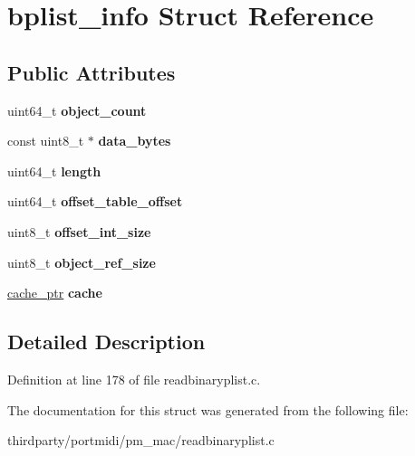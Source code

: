 \hypertarget{structbplist__info}{}\section{bplist\+\_\+info Struct Reference}
\label{structbplist__info}
\subsection*{Public Attributes}
\begin{DoxyCompactItemize}
\item 
\mbox{\label{structbplist__info_a2664eb47360dff6639f4085a50f321c9}} 
uint64\+\_\+t {\bfseries object\+\_\+count}
\item 
\mbox{\label{structbplist__info_ab0c039cf2d64b066815b31f648f3e165}} 
const uint8\+\_\+t $\ast$ {\bfseries data\+\_\+bytes}
\item 
\mbox{\label{structbplist__info_ae15894e235d748166b0c928e0a36670f}} 
uint64\+\_\+t {\bfseries length}
\item 
\mbox{\label{structbplist__info_ab999b6c7a605a4b0f9ba31d8ff10dc7f}} 
uint64\+\_\+t {\bfseries offset\+\_\+table\+\_\+offset}
\item 
\mbox{\label{structbplist__info_ab8fd5fa265f809e0ed0f245a1ae71ad6}} 
uint8\+\_\+t {\bfseries offset\+\_\+int\+\_\+size}
\item 
\mbox{\label{structbplist__info_ab8d0fc75c50cbbb4ae8ac400482d14bd}} 
uint8\+\_\+t {\bfseries object\+\_\+ref\+\_\+size}
\item 
\mbox{\label{structbplist__info_a3ea7b1feecc7c5fa1f988e39f57c7c4a}} 
\hyperlink{structcache__struct}{cache\+\_\+ptr} {\bfseries cache}
\end{DoxyCompactItemize}


\subsection{Detailed Description}


Definition at line 178 of file readbinaryplist.\+c.



The documentation for this struct was generated from the following file\+:\begin{DoxyCompactItemize}
\item 
thirdparty/portmidi/pm\+\_\+mac/readbinaryplist.\+c\end{DoxyCompactItemize}
